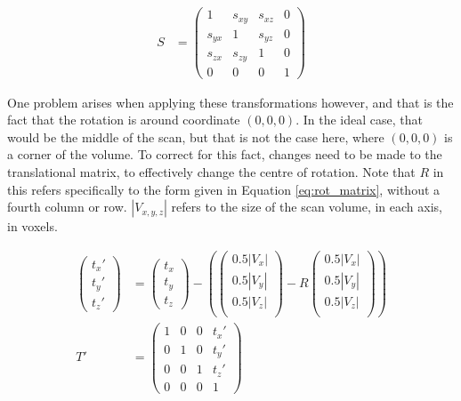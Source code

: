 \begin{align*}
  S &=
  \begin{pmatrix}
    1 & s_{xy} & s_{xz} & 0 \\
    s_{yx} & 1 & s_{yz} & 0 \\
    s_{zx} & s_{zy} & 1 & 0 \\
    0 & 0 & 0 & 1
  \end{pmatrix}
\end{align*}

One problem arises when applying these transformations however, and that is the fact that the rotation is around coordinate $(0,0,0)$. In the ideal case, that would be the middle of the scan, but that is not the case here, where $(0,0,0)$ is a corner of the volume. To correct for this fact, changes need to be made to the translational matrix, to effectively change the centre of rotation. Note that $R$ in this refers specifically to the form given in Equation \ref{eq:rot_matrix}, without a fourth column or row. $|V_{x,y,z}|$ refers to the size of the scan volume, in each axis, in voxels.

\begin{align*}
  \begin{pmatrix}
    t_x'\\
    t_y'\\
    t_z'
  \end{pmatrix}
  &=
  \begin{pmatrix}
    t_x\\
    t_y\\
    t_z
  \end{pmatrix}
  -
  \left(
  \begin{pmatrix}
    0.5|V_x| \\
    0.5|V_y| \\
    0.5|V_z| \\
  \end{pmatrix}
  -
  R
  \begin{pmatrix}
    0.5|V_x| \\
    0.5|V_y| \\
    0.5|V_z| \\
  \end{pmatrix}
  \right)\\
  T' &=
  \begin{pmatrix}
    1 & 0 & 0 & t_x' \\
    0 & 1 & 0 & t_y' \\
    0 & 0 & 1 & t_z' \\
    0 & 0 & 0 & 1
  \end{pmatrix}
\end{align*}

